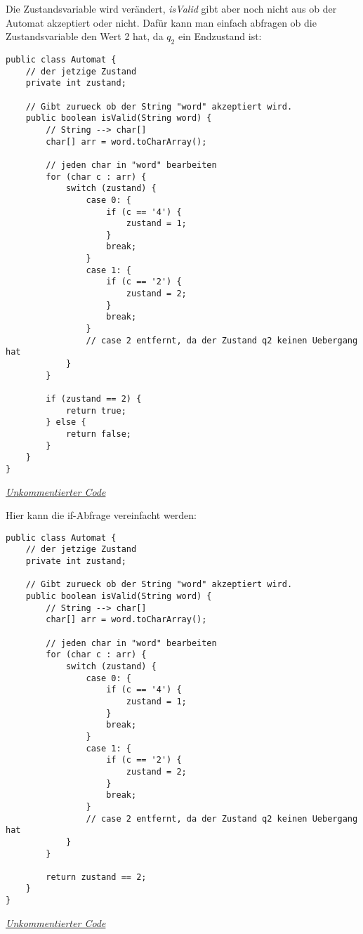 \begin{flushleft}
    Die Zustandsvariable wird verändert, \textit{isValid} gibt aber noch nicht aus ob der Automat akzeptiert oder nicht.
    Dafür kann man einfach abfragen ob die Zustandsvariable den Wert 2 hat, da $q_2$ ein Endzustand ist:
\end{flushleft}

\begin{center}
\begin{lstlisting}
public class Automat {
    // der jetzige Zustand
    private int zustand;

    // Gibt zurueck ob der String "word" akzeptiert wird.
    public boolean isValid(String word) {
        // String --> char[]
        char[] arr = word.toCharArray();

        // jeden char in "word" bearbeiten
        for (char c : arr) {
            switch (zustand) {
                case 0: {
                    if (c == '4') {
                        zustand = 1;
                    }
                    break;
                }
                case 1: {
                    if (c == '2') {
                        zustand = 2;
                    }
                    break;
                }
                // case 2 entfernt, da der Zustand q2 keinen Uebergang hat
            }
        }

        if (zustand == 2) {
            return true;
        } else {
            return false;
        }
    }
}
\end{lstlisting}
\href{https://raw.githubusercontent.com/tim-tm/informatik-notes/main/code/Automat.java}{\textit{Unkommentierter Code}} \\
\end{center}

\begin{flushleft}
    Hier kann die if-Abfrage vereinfacht werden: 
\end{flushleft}

\begin{center}
\begin{lstlisting}
public class Automat {
    // der jetzige Zustand
    private int zustand;

    // Gibt zurueck ob der String "word" akzeptiert wird.
    public boolean isValid(String word) {
        // String --> char[]
        char[] arr = word.toCharArray();

        // jeden char in "word" bearbeiten
        for (char c : arr) {
            switch (zustand) {
                case 0: {
                    if (c == '4') {
                        zustand = 1;
                    }
                    break;
                }
                case 1: {
                    if (c == '2') {
                        zustand = 2;
                    }
                    break;
                }
                // case 2 entfernt, da der Zustand q2 keinen Uebergang hat
            }
        }

        return zustand == 2;
    }
}
\end{lstlisting}
\href{https://raw.githubusercontent.com/tim-tm/informatik-notes/main/code/Automat.java}{\textit{Unkommentierter Code}} \\
\end{center}

